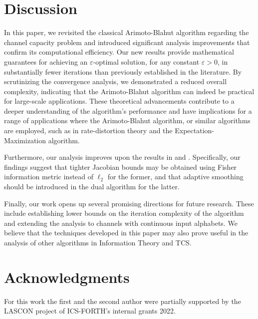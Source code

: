 \documentclass[11pt, letterpaper]{article}
\begin{document}
\section{Discussion}\label{discussion}

In this paper, we revisited the classical Arimoto-Blahut algorithm regarding the channel capacity problem and introduced significant analysis improvements that confirm its computational efficiency. Our new results provide mathematical guarantees for achieving an $\varepsilon$-optimal solution, for any constant $\varepsilon>0$, in substantially fewer iterations than previously established in the literature. By scrutinizing the convergence analysis, we demonstrated a reduced overall complexity, indicating that the Arimoto-Blahut algorithm can indeed be practical for large-scale applications. These theoretical advancements contribute to a deeper understanding of the algorithm's performance and have implications for a range of applications where the Arimoto-Blahut algorithm, or similar algorithms are employed, such as in rate-distortion theory and the Expectation-Maximization algorithm.

Furthermore, our analysis improves upon the results in \cite{Nakagawa2020AnalysisOT} and \cite{SutterSEL15}. Specifically, our findings suggest that tighter Jacobian bounds may be obtained using Fisher information metric instead of $\ell_2$ for the former, and that adaptive smoothing should be introduced in the dual algorithm for the latter.

Finally, our work opens up several promising directions for future research. These include establishing lower bounds on the iteration complexity of the algorithm and extending the analysis to channels with continuous input alphabets. We believe that the techniques developed in this paper may also prove useful in the analysis of other algorithms in Information Theory and TCS.

\section*{Acknowledgments}

For this work the first and the second author were partially supported by the LASCON project of ICS-FORTH's internal grants 2022.

\printbibliography
\end{document}

